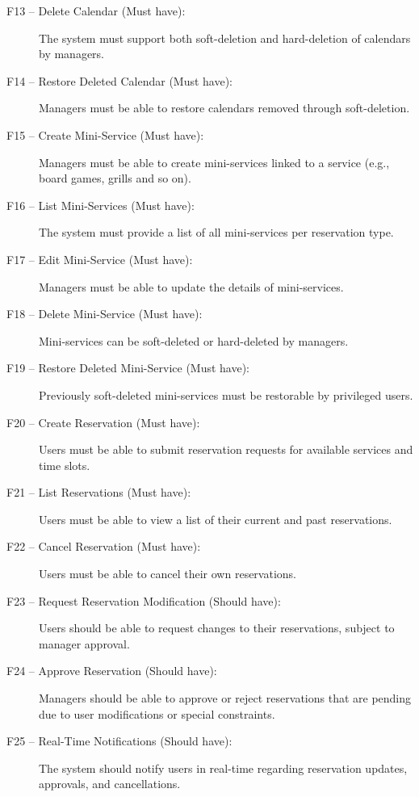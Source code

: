 \begin{description}
  \item [F13 -- Delete Calendar (Must have):] The system must support both soft-deletion and hard-deletion of calendars by managers.

  \item [F14 -- Restore Deleted Calendar (Must have):] Managers must be able to restore calendars removed through soft-deletion.

  \item [F15 -- Create Mini-Service (Must have):] Managers must be able to create mini-services linked to a service (e.g., board games, grills and so on).

  \item [F16 -- List Mini-Services (Must have):] The system must provide a list of all mini-services per reservation type.

  \item [F17 -- Edit Mini-Service (Must have):] Managers must be able to update the details of mini-services.

  \item [F18 -- Delete Mini-Service (Must have):] Mini-services can be soft-deleted or hard-deleted by managers.

  \item [F19 -- Restore Deleted Mini-Service (Must have):] Previously soft-deleted mini-services must be restorable by privileged users.

  \item [F20 -- Create Reservation (Must have):] Users must be able to submit reservation requests for available services and time slots.

  \item [F21 -- List Reservations (Must have):] Users must be able to view a list of their current and past reservations.

  \item [F22 -- Cancel Reservation (Must have):] Users must be able to cancel their own reservations.

  \item [F23 -- Request Reservation Modification (Should have):] Users should be able to request changes to their reservations, subject to manager approval.

  \item [F24 -- Approve Reservation (Should have):] Managers should be able to approve or reject reservations that are pending due to user modifications or special constraints.

  \item [F25 -- Real-Time Notifications (Should have):] The system should notify users in real-time regarding reservation updates, approvals, and cancellations.


\end{description}
